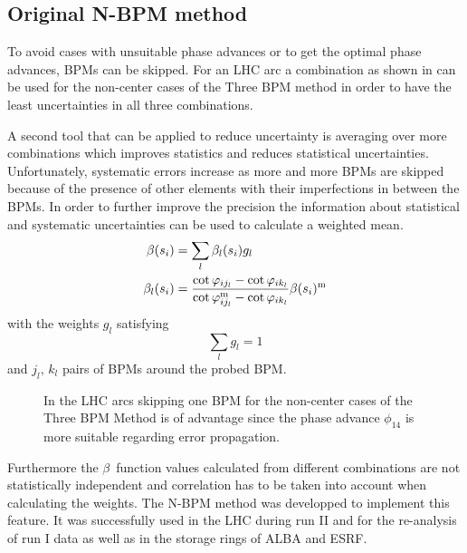 \subsection{Original N-BPM method}

To avoid cases with unsuitable phase advances or to get the optimal phase advances, BPMs can be
skipped. For an LHC arc a combination as shown in  can be used for the non-center
cases of the Three BPM method in order to have the least uncertainties in all three combinations.

A second tool that can be applied to reduce uncertainty is averaging over more combinations which
improves statistics and reduces statistical uncertainties.
Unfortunately, systematic errors increase
as more and more BPMs are skipped because of the presence of other elements with their imperfections in between the
BPMs.
In order to further improve the precision the information about statistical and systematic
uncertainties can be used to calculate a weighted mean. 
%
\begin{align}
    \beta(s_i) &= \sum\limits_{l} \beta_l(s_i) g_l
    \label{eq_beta_wmean}\\
    \beta_l(s_i) &= \frac{\cot\varphi_{ij_l} - \cot\varphi_{ik_l}}{\cot\varphi_{ij_l}^\text{m} - \cot\varphi_{ik_l}} \beta(s_i)^\text{m}
    \label{eq_beta_l}
\end{align}
%
with the weights $g_l$ satisfying
%
\begin{equation}
    \sum\limits_l g_l = 1
\end{equation}
%
and $j_l,\,k_l$ pairs of BPMs around the probed BPM.


\begin{figure}
    \centering
    
    \caption{In the LHC arcs skipping one BPM for the non-center cases of the Three BPM Method
    is of advantage since the phase advance $\phi_{14}$
    is more suitable regarding error propagation.}
    \label{fig_skip_one_BPM}
\end{figure}
%
Furthermore the $\beta$~function values calculated from different combinations are not statistically
independent and correlation has to be taken into account when calculating the weights.
The N-BPM method \cite{LangnerNBPM, Langner2017} was developped to implement this feature.
It was successfully used in the LHC during run II and for the re-analysis of run I data
as well as in the storage rings of ALBA and ESRF.

